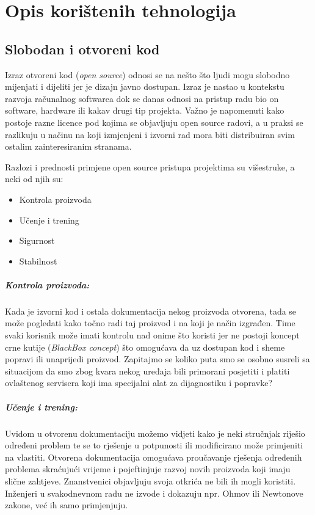 \chapter{Opis korištenih tehnologija}\label{technologyStack}
\section{Slobodan i otvoreni kod}
Izraz otvoreni kod (\textit{open source}) odnosi se na nešto što ljudi mogu slobodno mijenjati i dijeliti jer je dizajn javno dostupan\cite{WhatIsOpenSource}.
Izraz je nastao u kontekstu razvoja računalnog softwarea dok se danas odnosi na pristup radu bio on software, hardware ili kakav drugi tip projekta.
Važno je napomenuti kako postoje razne licence pod kojima se objavljuju open source radovi, a u praksi se razlikuju u načinu na koji izmjenjeni i izvorni rad mora biti distribuiran svim ostalim zainteresiranim stranama.

Razlozi i prednosti primjene open source pristupa projektima su višestruke, a neki od njih su:
\begin{itemize}
\item Kontrola proizvoda
\item Učenje i trening
\item Sigurnost
\item Stabilnost
\end{itemize}

\paragraph{Kontrola proizvoda:}
Kada je izvorni kod i ostala dokumentacija nekog proizvoda otvorena, tada se može pogledati kako točno radi taj proizvod i na koji je način izgrađen.
Time svaki korisnik može imati kontrolu nad onime što koristi jer ne postoji koncept crne kutije (\textit{BlackBox concept}) što omogućava da uz dostupan kod i sheme popravi ili unaprijedi proizvod.
Zapitajmo se koliko puta smo se osobno susreli sa situacijom da smo zbog kvara nekog uređaja bili primorani posjetiti i platiti ovlaštenog servisera koji ima specijalni alat za dijagnostiku i popravke?

\paragraph{Učenje i trening:}
Uvidom u otvorenu dokumentaciju možemo vidjeti kako je neki stručnjak riješio određeni problem te se to rješenje u potpunosti ili modificirano može primjeniti na vlastiti.
Otvorena dokumentacija omogućava proučavanje rješenja određenih problema skraćujući vrijeme i pojeftinjuje razvoj novih proizvoda koji imaju slične zahtjeve.
Znanstvenici objavljuju svoja otkrića ne bili ih mogli koristiti.
Inženjeri u svakodnevnom radu ne izvode i dokazuju npr. Ohmov ili Newtonove zakone, već ih samo primjenjuju.

